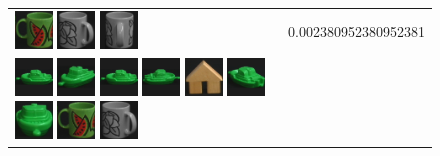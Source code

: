 \begin{figure}[tbp]
\begin{center}
\begin{tabular}{m{11cm} | m{3cm} |}
\includegraphics[width=1cm]{coil/beeld-31.eps}
\includegraphics[width=1cm]{coil/beeld-49.eps}
\includegraphics[width=1cm]{coil/beeld-50.eps}
& {\scriptsize 0.002380952380952381}
\\
\includegraphics[width=1cm]{coil/beeld-54.eps}
\includegraphics[width=1cm]{coil/beeld-57.eps}
\includegraphics[width=1cm]{coil/beeld-54.eps}
\includegraphics[width=1cm]{coil/beeld-55.eps}
\includegraphics[width=1cm]{coil/beeld-42.eps}
\includegraphics[width=1cm]{coil/beeld-58.eps}
\includegraphics[width=1cm]{coil/beeld-56.eps}
\includegraphics[width=1cm]{coil/beeld-31.eps}
\includegraphics[width=1cm]{coil/beeld-49.eps}

\end{tabular}
\end{center}
\end{figure}
